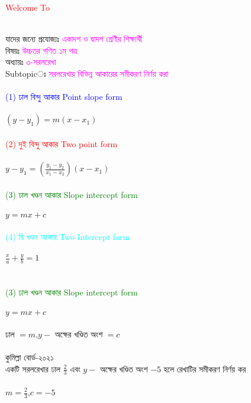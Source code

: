 \documentclass{article}
\begin{document}
 
	\Large
	\textcolor{red}{Welcome To} 
	\\
	\\
	যাদের জন্যে প্রযোজ্যঃ  	\textcolor{magenta}{একাদশ ও দ্বাদশ শ্রেণীর শিক্ষার্থী} \\
	বিষয়ঃ \textcolor{magenta}{উচ্চতর গণিত ১ম পত্র} \\
	অধ্যায়ঃ \textcolor{magenta}{৩-সরলরেখা}\\ 
	Subtopicঃ  \textcolor{magenta}{  সরলরেখার বিভিন্ন আকারের সমীকরণ নির্ণয় করা   }\\
	\\
	\textcolor{blue}{(1)	ঢাল বিন্দু আকার Point slope form}\\
	\\
	$(y-y_1)=m(x-x_1)$\\
	\\
	\textcolor{red} {(2)  দুই বিন্দু আকার 	Two point form}\\
	\\
	$y-y_1=\left(\frac{y_1-y_2}{x_1-x_2}\right)(x-x_1)$\\
	\\
	\textcolor{green}{ (3) ঢাল খণ্ডন আকার 	Slope intercept form}\\
	\\
	$y=mx+c$\\
	\\
	\textcolor{cyan}{ (4) দ্বি খণ্ডন আকার  Two	Intercept form}\\
	\\
	$\frac{x}{a}+\frac{y}{b}=1$\\
	\\
	\vspace{6cm}
	\\
\textcolor{green}{ (3) ঢাল খণ্ডন আকার 	Slope intercept form}\\
\\
$y=mx+c$\\
\\
ঢাল $=m$,\qquad $y-$ অক্ষের খণ্ডিত অংশ $=c$\\
\\ 
	কুমিল্লা বোর্ড-২০২১\\
  একটি সরলরেখার ঢাল $\frac{2}{3}$ এবং $y-$ অক্ষের খণ্ডিত অংশ $-5$ হলে রেখাটির সমীকরণ নির্ণয় কর\\ 
  \\
  $m=\frac{2}{3}$,\qquad $c=-5$\\
\end{document}
